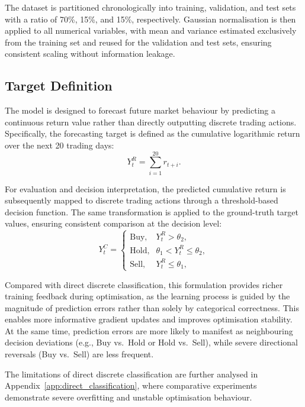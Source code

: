 \documentclass[10pt]{article} %
\begin{document}
The dataset is partitioned chronologically into training, validation, and test sets with a ratio of 70\%, 15\%, and 15\%, respectively. Gaussian normalisation is then applied to all numerical variables, with mean and variance estimated exclusively from the training set and reused for the validation and test sets, ensuring consistent scaling without information leakage.

\subsection{Target Definition}

The model is designed to forecast future market behaviour by predicting a continuous return value rather than directly outputting discrete trading actions. 
Specifically, the forecasting target is defined as the cumulative logarithmic return over the next 20 trading days:
\begin{equation}
Y_{t}^{R} = \sum_{i=1}^{20} r_{t+i}.
\end{equation}

For evaluation and decision interpretation, the predicted cumulative return is subsequently mapped to discrete trading actions through a threshold-based decision function. 
The same transformation is applied to the ground-truth target values, ensuring consistent comparison at the decision level:
\begin{equation}
Y_{t}^{C} =
\begin{cases}
\text{Buy},  & Y_{t}^{R} > \theta_2, \\
\text{Hold}, & \theta_1 < Y_{t}^{R} \le \theta_2, \\
\text{Sell}, & Y_{t}^{R} \le \theta_1,
\end{cases}
\end{equation}


Compared with direct discrete classification, this formulation provides richer training feedback during optimisation, as the learning process is guided by the magnitude of prediction errors rather than solely by categorical correctness. 
This enables more informative gradient updates and improves optimisation stability. 
At the same time, prediction errors are more likely to manifest as neighbouring decision deviations (e.g., Buy vs.\ Hold or Hold vs.\ Sell), while severe directional reversals (Buy vs.\ Sell) are less frequent.

The limitations of direct discrete classification are further analysed in Appendix~\ref{app:direct_classification}, where comparative experiments demonstrate severe overfitting and unstable optimisation behaviour.
\end{document}
